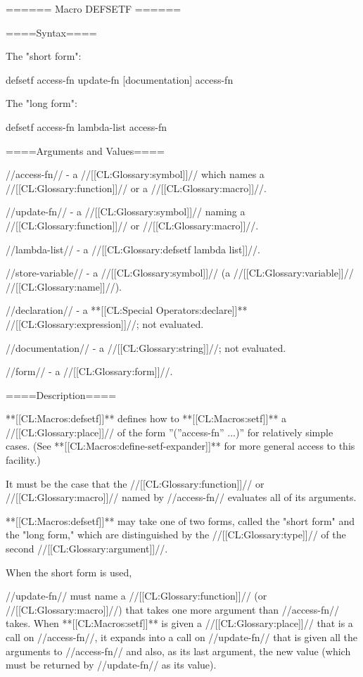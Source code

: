 ====== Macro DEFSETF ======

====Syntax====

The "short form":

\DefmacWithValuesNewline defsetf {access-fn update-fn [documentation]} {access-fn}

The "long form":

\DefmacWithValuesNewline defsetf {access-fn lambda-list  {\DeclsAndDoc} } {access-fn}

====Arguments and Values====

//access-fn// - a //[[CL:Glossary:symbol]]// which names a //[[CL:Glossary:function]]// or a //[[CL:Glossary:macro]]//.

//update-fn// - a //[[CL:Glossary:symbol]]// naming a //[[CL:Glossary:function]]// or //[[CL:Glossary:macro]]//.

//lambda-list// - a //[[CL:Glossary:defsetf lambda list]]//.

//store-variable// - a //[[CL:Glossary:symbol]]// (a //[[CL:Glossary:variable]]// //[[CL:Glossary:name]]//).

//declaration// - a **[[CL:Special Operators:declare]]** //[[CL:Glossary:expression]]//; not evaluated.

//documentation// - a //[[CL:Glossary:string]]//; not evaluated.

//form// - a //[[CL:Glossary:form]]//.

====Description====

**[[CL:Macros:defsetf]]** defines how to **[[CL:Macros:setf]]** a //[[CL:Glossary:place]]// of the form ''(''access-fn'' ...)'' for relatively simple cases. (See **[[CL:Macros:define-setf-expander]]** for more general access to this facility.)

It must be the case that the //[[CL:Glossary:function]]// or //[[CL:Glossary:macro]]// named by //access-fn// evaluates all of its arguments.

**[[CL:Macros:defsetf]]** may take one of two forms, called the "short form" and the "long form," which are distinguished by the //[[CL:Glossary:type]]// of the second //[[CL:Glossary:argument]]//.

When the short form is used,

//update-fn// must name a //[[CL:Glossary:function]]// (or //[[CL:Glossary:macro]]//) that takes one more argument than //access-fn// takes. When **[[CL:Macros:setf]]** is given a //[[CL:Glossary:place]]// that is a call on //access-fn//, it expands into a call on //update-fn// that is given all the arguments to //access-fn// and also, as its last argument, the new value (which must be returned by //update-fn// as its value).

